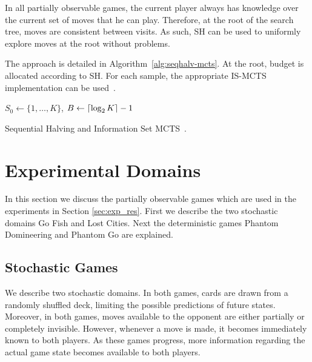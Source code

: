 \documentclass[a4paper]{llncs}
\DeclarePairedDelimiter{\ceil}{\lceil}{\rceil}
\DeclarePairedDelimiter{\floor}{\lfloor}{\rfloor}
\begin{document}
In all partially observable games, the current player always has knowledge over the current set of moves that he can play. Therefore, at the root of the search tree, moves are consistent between visits. As such, SH can be used to uniformly explore moves at the root without problems. 

The approach is detailed in Algorithm~\ref{alg:seqhalv-mcts}. At the root, budget is allocated according to SH. For each sample, the appropriate IS-MCTS implementation can be used~\cite{cowling2012}.

\IncMargin{1em}
\begin{algorithm2e}[ht]
	\vspace{0.05cm}
	$S_0 \gets \{1,\dots,K\}$,
	$B \gets \ceil{\log_2{K}} - 1$														\;
	\BlankLine
  \caption[Sequential Halving]{Sequential Halving and Information Set MCTS~\protect\cite{Karnin13SH,cowling2012}. \label{alg:seqhalv-mcts}}
\end{algorithm2e}
\DecMargin{1em}

\section{Experimental Domains}
\label{sec:exp_dom}

In this section we discuss the partially observable games which are used in the experiments in Section \ref{sec:exp_res}. First we describe the two stochastic domains Go Fish and Lost Cities. Next the deterministic games Phantom Domineering and Phantom Go are explained.

\subsection{Stochastic Games}

We describe two stochastic domains. In both games, cards are drawn from a randomly shuffled deck, limiting the possible predictions of future states. Moreover, in both games, moves available to the opponent are either partially or completely invisible. However, whenever a move is made, it becomes immediately known to both players. As these games progress, more information regarding the actual game state becomes available to both players.
\end{document}
